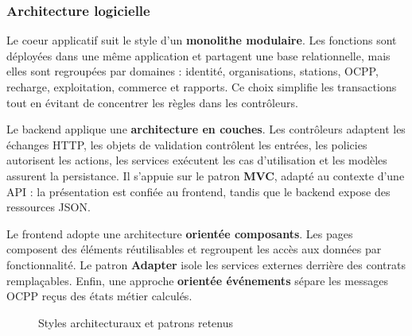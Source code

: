 \subsubsection{Architecture logicielle}

Le coeur applicatif suit le style d'un \textbf{monolithe modulaire}. Les fonctions
sont déployées dans une même application et partagent une base relationnelle,
mais elles sont regroupées par domaines : identité, organisations, stations,
OCPP, recharge, exploitation, commerce et rapports. Ce choix simplifie les
transactions tout en évitant de concentrer les règles dans les contrôleurs.

Le backend applique une \textbf{architecture en couches}. Les contrôleurs adaptent
les échanges HTTP, les objets de validation contrôlent les entrées, les policies
autorisent les actions, les services exécutent les cas d'utilisation et les
modèles assurent la persistance. Il s'appuie sur le patron \textbf{MVC}, adapté au
contexte d'une API : la présentation est confiée au frontend, tandis que le
backend expose des ressources JSON.

Le frontend adopte une architecture \textbf{orientée composants}. Les pages
composent des éléments réutilisables et regroupent les accès aux données par
fonctionnalité. Le patron \textbf{Adapter} isole les services externes derrière
des contrats remplaçables. Enfin, une approche \textbf{orientée événements}
sépare les messages OCPP reçus des états métier calculés.

\begin{figure}[H]
  \centering
  \resizebox{0.94\textwidth}{!}{}
  \caption{Styles architecturaux et patrons retenus}
  \label{fig:architectural-styles}
\end{figure}
